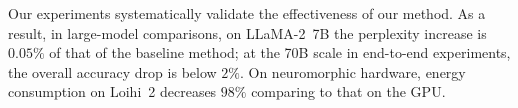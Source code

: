 \documentclass{article}
\theoremstyle{plain}
\theoremstyle{definition}
\theoremstyle{remark}
\begin{document}

Our experiments systematically validate the effectiveness of our method. 
As a result, in large-model comparisons, on LLaMA-2~7B the perplexity increase is $0.05\%$ of that of the baseline method; at the 70B scale in end-to-end experiments, the overall accuracy drop is below $2\%$.
On neuromorphic hardware, energy consumption on Loihi~2 decreases $98\%$ comparing to that on the GPU.
\end{document}
